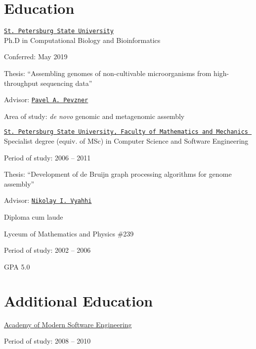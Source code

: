 
\section{Education}
\href{http://english.spbu.ru/}{\tt St.~Petersburg State University}\\
  Ph.D in Computational Biology and Bioinformatics
\begin{innerlist}
  \item Conferred: May 2019
  \item Thesis: ``Assembling genomes of non-cultivable microorganisms from high-throughput sequencing data''
  \item Advisor: \href{http://cseweb.ucsd.edu/~ppevzner/}{\tt Pavel A.~Pevzner}
  \item Area of study: \textit{de novo} genomic and metagenomic assembly
\end{innerlist}

\blankline

\href{http://www.math.spbu.ru/en/index.html}{\tt St.~Petersburg State University, Faculty of Mathematics and Mechanics%
}\\
  Specialist degree (equiv. of MSc) in Computer Science and Software Engineering
\begin{innerlist}
  \item Period of study: 2006 -- 2011
  \item Thesis: ``Development of de Bruijn graph processing algorithms for genome assembly''
  \item Advisor: \href{http://spbsu.ru/vyahhi/}{\tt Nikolay I.~Vyahhi}
  \item Diploma cum laude
\end{innerlist}

\blankline

Lyceum of Mathematics and Physics \#239
\begin{innerlist}
  \item Period of study: 2002 -- 2006
  \item GPA 5.0
\end{innerlist}

\section{Additional Education}
\href{http://www.amse.ru/}{Academy of Modern Software Engineering}
\begin{innerlist}
  \item Period of study: 2008 -- 2010
\end{innerlist}

